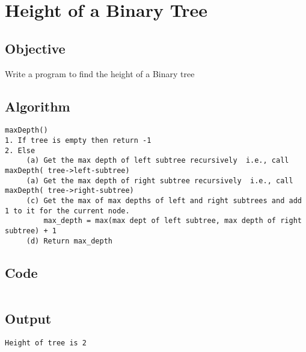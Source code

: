 \section{Height of a Binary Tree}
\label{sec:Height of a Binary Tree}

\subsection{Objective}
Write a program to find the height of a Binary tree

\subsection{Algorithm}
\begin{lstlisting}[style=mystyle]
maxDepth()
1. If tree is empty then return -1
2. Else
     (a) Get the max depth of left subtree recursively  i.e., call maxDepth( tree->left-subtree)
     (a) Get the max depth of right subtree recursively  i.e., call maxDepth( tree->right-subtree)
     (c) Get the max of max depths of left and right subtrees and add 1 to it for the current node.
         max_depth = max(max dept of left subtree, max depth of right subtree) + 1
     (d) Return max_depth
\end{lstlisting}

\subsection{Code}
\inputminted[]{c}{../../Code/btheight.c}

\subsection{Output}
\begin{lstlisting}[style=output]
    Height of tree is 2
\end{lstlisting}

\pagebreak
